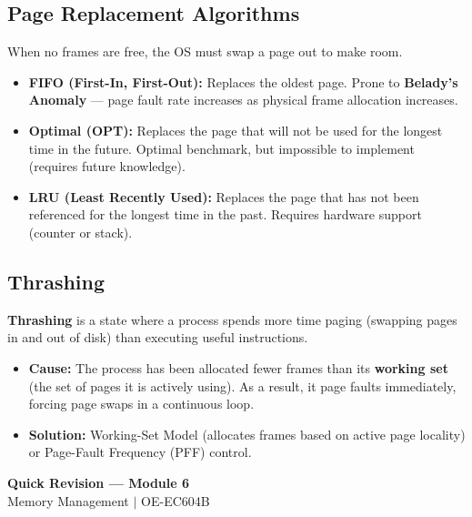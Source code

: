 \documentclass[12pt,a4paper]{article}
\begin{document}
\subsection{Page Replacement Algorithms}
When no frames are free, the OS must swap a page out to make room.
\begin{itemize}[leftmargin=*, itemsep=3pt]
  \item \textbf{FIFO (First-In, First-Out):} Replaces the oldest page. Prone to \textbf{Belady's Anomaly} --- page fault rate increases as physical frame allocation increases.
  \item \textbf{Optimal (OPT):} Replaces the page that will not be used for the longest time in the future. Optimal benchmark, but impossible to implement (requires future knowledge).
  \item \textbf{LRU (Least Recently Used):} Replaces the page that has not been referenced for the longest time in the past. Requires hardware support (counter or stack).
\end{itemize}

\subsection{Thrashing}
\textbf{Thrashing} is a state where a process spends more time paging (swapping pages in and out of disk) than executing useful instructions.
\begin{itemize}[leftmargin=*, itemsep=3pt]
  \item \textbf{Cause:} The process has been allocated fewer frames than its \textbf{working set} (the set of pages it is actively using). As a result, it page faults immediately, forcing page swaps in a continuous loop.
  \item \textbf{Solution:} Working-Set Model (allocates frames based on active page locality) or Page-Fault Frequency (PFF) control.
\end{itemize}

\newpage
\begin{center}
  {\large\bfseries\color{myred} Quick Revision --- Module 6}\\[3pt]
  {\small\color{mydark} Memory Management $|$ OE-EC604B}
\end{center}
\noindent{\color{myred}\rule{\linewidth}{1.2pt}}
\vspace{4pt}
\end{document}
